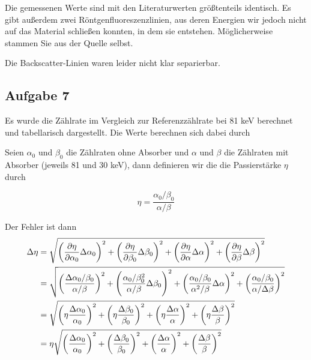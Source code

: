 \documentclass[a4paper,german,12pt,smallheadings]{scrartcl}
\begin{document}
Die gemessenen Werte sind mit den Literaturwerten größtenteils identisch. Es
gibt außerdem zwei Röntgenfluoreszenzlinien, aus deren Energien wir jedoch
nicht auf das Material schließen konnten, in dem sie entstehen. Möglicherweise
stammen Sie aus der Quelle selbst.

Die Backscatter-Linien waren leider nicht klar separierbar.

\subsection{Aufgabe 7}

Es wurde die Zählrate im Vergleich zur Referenzzählrate bei 81 keV berechnet
und tabellarisch dargestellt. Die Werte berechnen sich dabei durch

Seien $\alpha_0$ und $\beta_0$ die Zählraten ohne Absorber und $\alpha$ und
$\beta$ die Zählraten mit Absorber (jeweils 81 und 30 keV), dann definieren wir
die die Passierstärke $\eta$ durch

\begin{equation}
  \eta = \frac{\alpha_0 / \beta_0}{\alpha / \beta}
\end{equation}

Der Fehler ist dann
\begin{align}
  \Delta \eta &= \sqrt{
    \del{
      \frac{\partial \eta}{\partial \alpha_0} \Delta \alpha_0
    }^2 +
    \del{
      \frac{\partial \eta}{\partial \beta_0} \Delta \beta_0
    }^2 +
    \del{
      \frac{\partial \eta}{\partial \alpha} \Delta \alpha
    }^2 +
    \del{
      \frac{\partial \eta}{\partial \beta} \Delta \beta
    }^2
  } \\
  &=
  \sqrt{
    \del{
      \frac{\Delta \alpha_0 / \beta_0}{\alpha / \beta}
    }^2 +
    \del{
      \frac{\alpha_0 / \beta_0^2}{\alpha / \beta} \Delta \beta_0
    }^2 +
    \del{
      \frac{\alpha_0 / \beta_0}{\alpha^2 / \beta}  \Delta \alpha
    }^2 +
    \del{
      \frac{\alpha_0 / \beta_0}{\alpha / \Delta \beta}
    }^2
  } \\
  &=
  \sqrt{
    \del{
      \eta \frac{\Delta \alpha_0}{\alpha_0}
    }^2 +
    \del{
      \eta \frac{\Delta \beta_0}{\beta_0}
    }^2 +
    \del{
      \eta \frac{\Delta \alpha}{\alpha}
    }^2 +
    \del{
      \eta \frac{\Delta \beta}{\beta}
    }^2
  } \\
  &=
  \eta
  \sqrt{
    \del{
      \frac{\Delta \alpha_0}{\alpha_0}
    }^2 +
    \del{
      \frac{\Delta \beta_0}{\beta_0}
    }^2 +
    \del{
      \frac{\Delta \alpha}{\alpha}
    }^2 +
    \del{
      \frac{\Delta \beta}{\beta}
    }^2
  }
\end{align}
\end{document}

